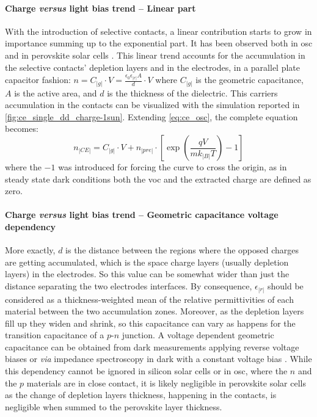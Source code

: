 		\paragraph{Charge \textit{versus} light bias trend -- Linear part}
		With the introduction of selective contacts, a linear contribution starts to grow in importance summing up to the exponential part.
		It has been observed both in \gls{osc} \cite{Ryan2017a,Credgington2014} and in perovskite solar cells \cite{Gelmetti2017,Wheeler2017,Du2018}.
		This linear trend accounts for the accumulation in the selective contacts' depletion layers and in the electrodes, in a parallel plate capacitor fashion: $n = C_|g| \cdot V = \frac{\epsilon_0 \epsilon_|r| A}{d} \cdot V$ where $C_|g|$ is the geometric capacitance, $A$ is the active area, and $d$ is the thickness of the dielectric.
		This carriers accumulation in the contacts can be visualized with the simulation reported in \cref{fig:ce_single_dd_charge-1sun}.
		Extending \cref{eq:ce_osc}, the complete equation becomes:
		\begin{equation}\label{eq:ce_full}
			n_|CE| = C_|g| \cdot V + n_|pre| \cdot \left[\exp(\frac{qV}{mk_|B|T}) - 1\right]
		\end{equation}
		where the $-1$ was introduced for forcing the curve to cross the origin, as in steady state dark conditions both the \gls{voc} and the extracted charge are defined as zero.
		
		\paragraph{Charge \textit{versus} light bias trend -- Geometric capacitance voltage dependency}
		More exactly, $d$ is the distance between the regions where the opposed charges are getting accumulated, which is the space charge layers (usually depletion layers) in the electrodes.
		So this value can be somewhat wider than just the distance separating the two electrodes interfaces.
		By consequence, $\epsilon_|r|$ should be considered as a thickness-weighted mean of the relative permittivities of each material between the two accumulation zones.
		Moreover, as the depletion layers fill up they widen and shrink, so this capacitance can vary as happens for the transition capacitance of a $p$-$n$ junction.
		A voltage dependent geometric capacitance can be obtained from dark  measurements applying reverse voltage biases \cite{Kiermasch2018} or \textit{via} impedance spectroscopy in dark with a constant voltage bias \cite{Brus2016,Pockett2015}.
		While this dependency cannot be ignored in silicon solar cells or in \gls{osc}, where the $n$ and the $p$ materials are in close contact, it is likely negligible in perovskite solar cells as the change of depletion layers thickness, happening in the contacts, is negligible when summed to the perovskite layer thickness.

